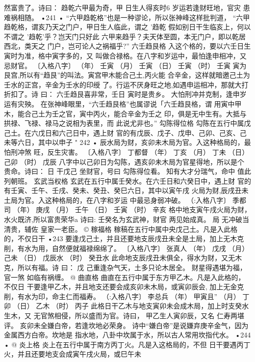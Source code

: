 然富贵了。诗曰：
趋乾六甲最为奇，甲 日生人得亥时6
岁运若逢财旺地，官灾 患难祸相随。
•241 •
“六甲趋乾格”也是一种谬论，所以张神峰这样批判道，
“六甲趋乾格，谓亥乃天之门户，甲日生人临此，谓之 '趋乾
假如别日干生临亥上，何以不谓之 '趋乾'乎？岂天门只好此
六甲来趋乎？夫天体至圆，本无门户，即以乾居西北，类天之
门户，岂可论人之祸福乎?”
六壬趋艮格
入这个格的，要以六壬日生寅时为准，格中寅字多的，又
叫做合禄格。在八字和岁运中，最怕逢申相冲，又忌财官。
〔入格八字〕
（年） 壬寅
（月） 壬寅
（日） 壬寅
（时） 壬寅
寅为艮宫,所以有“趋艮”的叫法。寅宫甲木能合己土,丙火能
合辛金，这样就暗邀己土为壬水的正宫，辛金为壬水的印绶
了。行运不厌身旺之地,如遇申运相冲，那就大打折扣了。诗
曰：
六壬趋艮喜非常，壬日 寅时是贵乡。
大怕刑冲并克制，逢申岁运有灾殃。
在张神峰眼里，“六壬趋艮格”也属谬说「六壬趋艮格，谓
用寅中甲木，能合己土为壬之官，寅中丙火，能合辛金为壬之
印，俱是无中生有。大抵与拱禄、飞禄、禄马之说相为表里，而
此说尤非也。”
勾陈得位格
勾陈在五行中属戊己土。在六戊日和六己日中，遇上财
官的有戊辰、戊子、戊申、己卯、己亥、己未等六日，其中以申子
" 242 •
辰水局为财，亥卯未木局为官。入这种格局的，最怕刑冲煞
旺，反生灾害。
〔入格八字〕 丁都督
（年） 丁亥
（月） 丁未
（日） 己卯
（时） 戊辰
八字中以己卯日为勾陈，遇亥卯未木局为官星得地，所以是个
贵命。诗曰：
日 干戊己 坐财官，号曰 勾陈得位看。
知有大才分瑞气，命中 值此列朝班。
玄武当权格
玄武在五行中属壬癸水。在六壬日和六癸日中，遇上财
官的有壬寅、壬午、壬戌、癸未、癸丑、癸巳六日，其中以寅午戌
火局为财,辰戌丑未土局为官。入这种格局的，在八字和岁运
中最忌身弱冲破。
（:入格八字〕 季都司
（年） 庚戌
（月） 壬午
（日） 壬寅
（时） 辛亥
格中地支寅午戌火局为财，水火既济,所以富贵荣华a 诗曰:
壬癸名为玄武神，财官 两见始成真。
局 无冲破当清贵，辅佐 皇家一老臣。
© 稼福格
稼稿在五行中属中央戊己土。凡是入此格的，不仅日干
•243
要逢戊己土，并且还要地支辰戌丑未全是土局，加上无木克
削，有水为用，自然便就福禄绵绵了。
〔入格八字〕 张真人
（年） 戊戌
（月） 己未
（日） 戊辰水
（时） 癸丑水
此命地支辰戌丑未俱全，得水为财，又无木克，所以有福。诗
曰：
戊 己重逢杂气天，土多只论木居全。
财星得遇堪为福，官一煞 如临有祸缠。
@ 曲直格
曲直在五行中属于东方甲乙木。凡是入此格的，不仅日
干要逢甲乙木，并且地支还要会成亥卯未木局，或寅卯辰会,
加上无金克削，有水为印，命主仁而福寿。
（:入格八字〕 李总兵
（年） 甲寅且''
（月） 丁卯
（日） 乙木
（时） 丙子
此格日干乙木与地支寅卯未会成木局，加上时支癸水生木，又
无官煞相侵，所以盛而为官。诗曰，
甲乙生人寅卯辰，又名 仁寿两堪评。
亥卯未全嫌白帝，若逢坎地必荣身。
诗中“嫌白帝”是说嫌弃庚辛金气，因为金属西方白帝。坎地是
指水地，八卦中坎属于水，所以古人常用坎指代水。
•244 •
@ 炎上格
炎上在五行中属于南方丙丁火。凡是入这格局的，不但
日干要遇丙丁火，并且还要地支会成寅午戌火局，或巳午未
